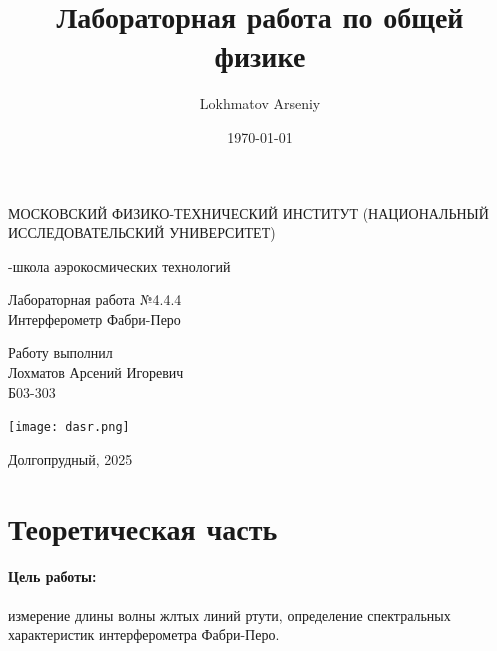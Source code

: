 \documentclass[a4paper,12pt]{article} %
\author{Lokhmatov Arseniy}
\title{Лабораторная работа по общей физике}
\date{\today}
\begin{document}
\begin{titlepage}
    \newpage
    \begin{center}
    {\large МОСКОВСКИЙ ФИЗИКО-ТЕХНИЧЕСКИЙ ИНСТИТУТ (НАЦИОНАЛЬНЫЙ ИССЛЕДОВАТЕЛЬСКИЙ УНИВЕРСИТЕТ)}
    \vspace{1cm}

    {-школа аэрокосмических технологий}
    \vspace{6em}
    \end{center}
    
    \vspace{1.2em}

    \begin{center}
    \Large Лабораторная работа №4.4.4 \\
    Интерферометр Фабри-Перо
    \linebreak
    \end{center}
    
    \vspace{11em}
    
    \begin{flushright}
                       {\large Работу выполнил\\
                       Лохматов Арсений Игоревич\\
                       Б03-303 }
    \end{flushright}

    \vspace{\fill}

    \begin{center}
        \texttt{[image: dasr.png]}
    \end{center}

    \begin{center}
    Долгопрудный, 2025
    \end{center}

    \end{titlepage}

\section{Теоретическая часть}

\paragraph{Цель работы:} измерение длины волны жлтых линий ртути, определение спектральных характеристик интерферометра Фабри-Перо.
\end{document}
